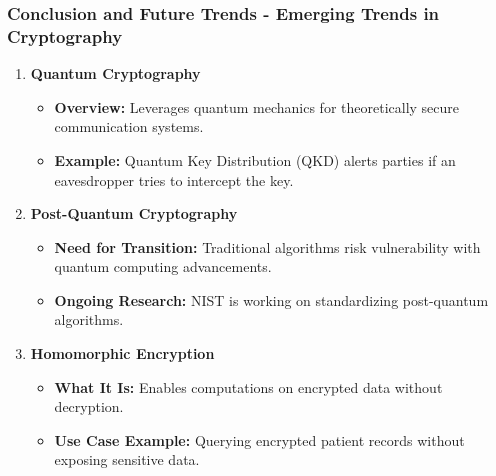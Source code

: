 \documentclass{beamer}
\begin{document}
\begin{frame}[fragile]
    \frametitle{Conclusion and Future Trends - Emerging Trends in Cryptography}
    \begin{enumerate}
        \item \textbf{Quantum Cryptography}
            \begin{itemize}
                \item \textbf{Overview:} Leverages quantum mechanics for theoretically secure communication systems.
                \item \textbf{Example:} Quantum Key Distribution (QKD) alerts parties if an eavesdropper tries to intercept the key.
            \end{itemize}
        
        \item \textbf{Post-Quantum Cryptography}
            \begin{itemize}
                \item \textbf{Need for Transition:} Traditional algorithms risk vulnerability with quantum computing advancements.
                \item \textbf{Ongoing Research:} NIST is working on standardizing post-quantum algorithms.
            \end{itemize}
        
        \item \textbf{Homomorphic Encryption}
            \begin{itemize}
                \item \textbf{What It Is:} Enables computations on encrypted data without decryption.
                \item \textbf{Use Case Example:} Querying encrypted patient records without exposing sensitive data.
            \end{itemize}
    \end{enumerate}
\end{frame}
\end{document}
